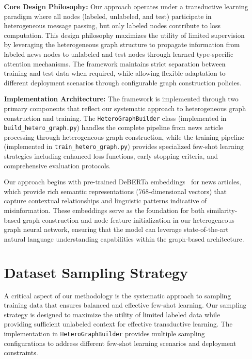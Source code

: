 \textbf{Core Design Philosophy:} Our approach operates under a transductive learning paradigm where all nodes (labeled, unlabeled, and test) participate in heterogeneous message passing, but only labeled nodes contribute to loss computation. This design philosophy maximizes the utility of limited supervision by leveraging the heterogeneous graph structure to propagate information from labeled news nodes to unlabeled and test nodes through learned type-specific attention mechanisms. The framework maintains strict separation between training and test data when required, while allowing flexible adaptation to different deployment scenarios through configurable graph construction policies.

\textbf{Implementation Architecture:} The framework is implemented through two primary components that reflect our systematic approach to heterogeneous graph construction and training. The \texttt{HeteroGraphBuilder} class (implemented in \texttt{build\_hetero\_graph.py}) handles the complete pipeline from news article processing through heterogeneous graph construction, while the training pipeline (implemented in \texttt{train\_hetero\_graph.py}) provides specialized few-shot learning strategies including enhanced loss functions, early stopping criteria, and comprehensive evaluation protocols.

Our approach begins with pre-trained DeBERTa embeddings~\cite{he2021deberta} for news articles, which provide rich semantic representations (768-dimensional vectors) that capture contextual relationships and linguistic patterns indicative of misinformation. These embeddings serve as the foundation for both similarity-based graph construction and node feature initialization in our heterogeneous graph neural network, ensuring that the model can leverage state-of-the-art natural language understanding capabilities within the graph-based architecture.

\section{Dataset Sampling Strategy}

A critical aspect of our methodology is the systematic approach to sampling training data that ensures balanced and effective few-shot learning. Our sampling strategy is designed to maximize the utility of limited labeled data while providing sufficient unlabeled context for effective transductive learning. The implementation in \texttt{HeteroGraphBuilder} provides multiple sampling configurations to address different few-shot learning scenarios and deployment constraints.

